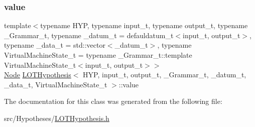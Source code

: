 \mbox{\label{class_l_o_t_hypothesis_ac759b3eab77ead1749b905a3dde74961}} 
\subsubsection{\texorpdfstring{value}{value}}
{\footnotesize\ttfamily template$<$typename H\+YP, typename input\+\_\+t, typename output\+\_\+t, typename \+\_\+\+Grammar\+\_\+t, typename \+\_\+datum\+\_\+t = defauldatum\+\_\+t$<$input\+\_\+t, output\+\_\+t$>$, typename \+\_\+data\+\_\+t = std\+::vector$<$\+\_\+datum\+\_\+t$>$, typename Virtual\+Machine\+State\+\_\+t = typename \+\_\+\+Grammar\+\_\+t\+::template Virtual\+Machine\+State\+\_\+t$<$input\+\_\+t, output\+\_\+t$>$$>$ \\
\hyperlink{class_node}{Node} \hyperlink{class_l_o_t_hypothesis}{L\+O\+T\+Hypothesis}$<$ H\+YP, input\+\_\+t, output\+\_\+t, \+\_\+\+Grammar\+\_\+t, \+\_\+datum\+\_\+t, \+\_\+data\+\_\+t, Virtual\+Machine\+State\+\_\+t $>$\+::value}



The documentation for this class was generated from the following file\+:\begin{DoxyCompactItemize}
\item 
src/\+Hypotheses/\hyperlink{_l_o_t_hypothesis_8h}{L\+O\+T\+Hypothesis.\+h}\end{DoxyCompactItemize}
